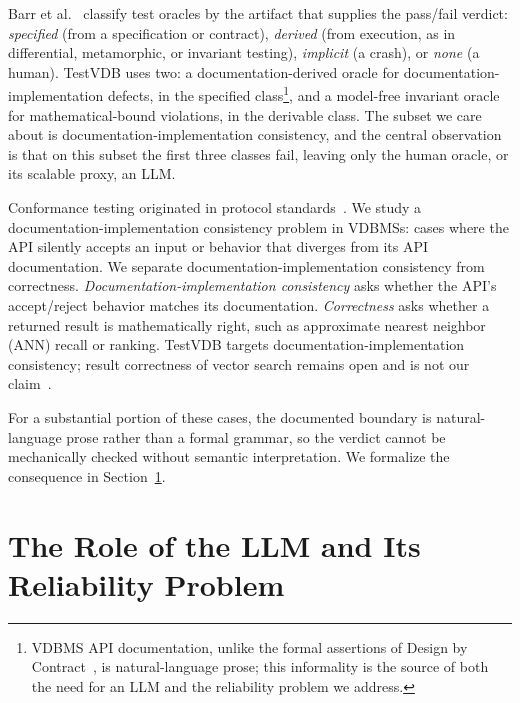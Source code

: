 \documentclass[sigconf]{acmart}
\begin{document}
Barr et al.~\cite{barr15} classify test oracles by the artifact that supplies the pass/fail verdict: \emph{specified} (from a specification or contract), \emph{derived} (from execution, as in differential, metamorphic, or invariant testing), \emph{implicit} (a crash), or \emph{none} (a human). TestVDB uses two: a documentation-derived oracle for documentation-implementation defects, in the specified class\footnote{VDBMS API documentation, unlike the formal assertions of Design by Contract~\cite{meyer92dbc}, is natural-language prose; this informality is the source of both the need for an LLM and the reliability problem we address.}, and a model-free invariant oracle for mathematical-bound violations, in the derivable class. The subset we care about is documentation-implementation consistency, and the central observation is that on this subset the first three classes fail, leaving only the human oracle, or its scalable proxy, an LLM.

Conformance testing originated in protocol standards~\cite{iso9646}. We study a documentation-implementation consistency problem in VDBMSs: cases where the API silently accepts an input or behavior that diverges from its API documentation. We separate documentation-implementation consistency from correctness. \emph{Documentation-implementation consistency} asks whether the API's accept/reject behavior matches its documentation. \emph{Correctness} asks whether a returned result is mathematically right, such as approximate nearest neighbor (ANN) recall or ranking. TestVDB targets documentation-implementation consistency; result correctness of vector search remains open and is not our claim~\cite{roadmap25}.

For a substantial portion of these cases, the documented boundary is natural-language prose rather than a formal grammar, so the verdict cannot be mechanically checked without semantic interpretation. We formalize the consequence in Section~\ref{sec:regime}.

\section{The Role of the LLM and Its Reliability Problem} \label{sec:regime}
\end{document}
